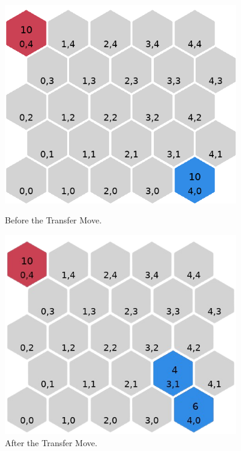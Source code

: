 \documentclass[letterpaper, 12pt]{article}
\begin{document}
\begin{figure}[H]
  \begin{minipage}[c]{.5\textwidth}
    \centering
    \includegraphics[width=0.9\textwidth]{transfer_example_1.png}
    \caption{Before the Transfer Move.}
    \label{fig:transfer_move}
  \end{minipage}%
  \begin{minipage}[c]{.5\textwidth} \centering
    \includegraphics[width=0.9\textwidth]{transfer_example_2.png}
    \caption{After the Transfer Move.}
  \end{minipage}
\end{figure}
\end{document}
